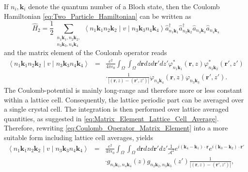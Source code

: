 If $n_{i},\mathbf{k}_{i}$ denote the quantum number of a Bloch state,
then the Coulomb Hamiltonian \ref{eq:Two_Particle_Hamiltonian} can
be written as\begin{equation}
\hat{H}_{2}=\frac{1}{2}\sum_{\begin{array}{c}
n_{1}\mathbf{k}_{1},n_{2}\mathbf{k}_{2},\\
n_{3}\mathbf{k}_{3},n_{4}\mathbf{k}_{4}\end{array}}\left\langle n_{1}\mathbf{k}_{1}n_{2}\mathbf{k}_{2}\mid v\mid n_{3}\mathbf{k}_{3}n_{4}\mathbf{k}_{4}\right\rangle \hat{a}_{n_{1}\mathbf{k}_{1}}^{\dagger}\hat{a}_{n_{2}\mathbf{k}_{2}}^{\dagger}\hat{a}_{n_{3}\mathbf{k}_{3}}\hat{a}_{n_{4}\mathbf{k}_{4}}\label{eq:Coulomb_Hamiltonian_1}\end{equation}
and the matrix element of the Coulomb operator reads\begin{eqnarray}
\left\langle n_{1}\mathbf{k}_{1}n_{2}\mathbf{k}_{2}\mid v\mid n_{3}\mathbf{k}_{3}n_{4}\mathbf{k}_{4}\right\rangle  & = & \frac{e^{2}}{4\pi\epsilon_{0}}\int_{\Omega}\int_{\Omega}d\mathbf{r}dzd\mathbf{r}'dz'\varphi_{n_{1}\mathbf{k}_{1}}^{*}(\mathbf{r},z)\varphi_{n_{2}\mathbf{k}_{2}}^{*}(\mathbf{r}',z')\nonumber \\
 &  & \cdot\frac{1}{\left|(\mathbf{r},z)-(\mathbf{r}',z')\right|}\varphi_{n_{4}\mathbf{k}_{4}}(\mathbf{r},z)\varphi_{n_{3}\mathbf{k}_{3}}(\mathbf{r}',z').\label{eq:Coulomb_Operator_Matrix_Element}\end{eqnarray}
The Coulomb-potential is mainly long-range and therefore more or less
constant within a lattice cell. Consequently, the lattice periodic
part can be averaged over a single crystal cell. The integration is
then performed over lattice averaged quantities, as suggested in \ref{eq:Matrix_Element_Lattice_Cell_Average}.
Therefore, rewriting \ref{eq:Coulomb_Operator_Matrix_Element} into
a more suitable form including lattice cell averages, yields\begin{eqnarray}
\left\langle n_{1}\mathbf{k}_{1}n_{2}\mathbf{k}_{2}\mid v\mid n_{3}\mathbf{k}_{3}n_{4}\mathbf{k}_{4}\right\rangle  & = & \frac{e^{2}}{4\pi\epsilon_{0}}\int_{\Omega}\int_{\Omega}d\mathbf{r}dzd\mathbf{r}'dz'\frac{1}{\mathcal{A}^{2}}e^{i\left(\mathbf{k}_{4}-\mathbf{k}_{1}\right)\cdot\mathbf{r}}e^{i\left(\mathbf{k}_{3}-\mathbf{k}_{2}\right)\cdot\mathbf{r}'}\nonumber \\
 &  & \cdot g_{n_{1}\mathbf{k}_{1},n_{4}\mathbf{k}_{4}}(z)g_{n_{2}\mathbf{k}_{2},n_{3}\mathbf{k}_{3}}(z')\frac{1}{\left|(\mathbf{r},z)-(\mathbf{r}',z')\right|},\end{eqnarray}
